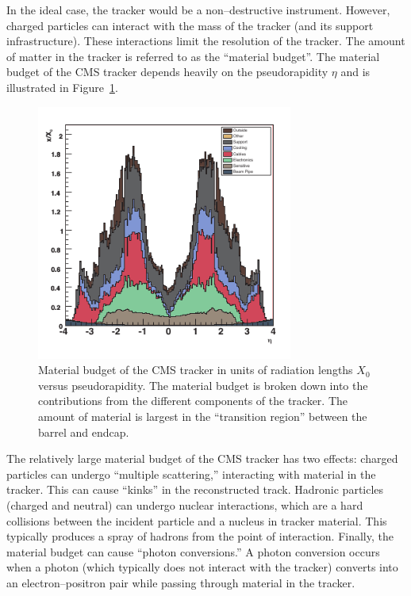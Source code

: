 In the ideal case, the tracker would be a non--destructive instrument.  However,
charged particles can interact with the mass of the tracker (and its support
infrastructure).  These interactions limit the resolution of the tracker.  The
amount of matter in the tracker is referred to as the ``material budget''.  The
material budget of the CMS tracker depends heavily on the pseudorapidity $\eta$
and is illustrated in Figure~\ref{fig:TrackerMaterialBudget}.
\begin{figure}
  \centering
  \includegraphics[width=0.75\textwidth]{detector_chapter/figures/tracker_material_budget_cleaned.pdf}
  \caption[Material budget of the CMS tracker]{Material budget of the CMS
  tracker in units of radiation lengths $X_0$ versus pseudorapidity.  The
  material budget is broken down into the contributions from the different
  components of the tracker.  The amount of material is largest in the
  ``transition region'' between the barrel and endcap.  }
  \label{fig:TrackerMaterialBudget}
\end{figure}
The relatively large material budget of the CMS tracker has two effects: charged
particles can undergo ``multiple scattering,'' interacting with material in the
tracker.  This can cause ``kinks'' in the reconstructed track.   Hadronic
particles (charged and neutral) can undergo nuclear interactions, which are a
hard collisions between the incident particle and a nucleus in tracker material.
This typically produces a spray of hadrons from the point of interaction.
Finally, the material budget can cause ``photon conversions.''  A photon
conversion occurs when a photon (which typically does not interact with the
tracker) converts into an electron--positron pair while passing through material
in the tracker.  

